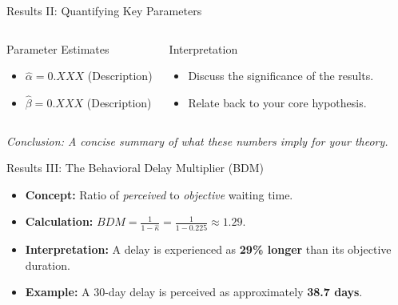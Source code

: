 \documentclass[10pt, aspectratio=169, xcolor={svgnames}]{beamer}
\begin{document}
\begin{frame}{Results II: Quantifying Key Parameters}
    \begin{columns}[T]
        \begin{block}{Parameter Estimates}
            \begin{itemize}
                \item $\hat{\alpha} = 0.XXX$ (Description)
                \item $\hat{\beta} = 0.XXX$ (Description)
            \end{itemize}
        \end{block}
        \begin{alertblock}{Interpretation}
            \begin{itemize}
                \item Discuss the significance of the results.
                \item Relate back to your core hypothesis.
            \end{itemize}
        \end{alertblock}
    \end{columns}
    \centering
    \vspace{0.5cm}
    \textit{Conclusion: A concise summary of what these numbers imply for your theory.}
\end{frame}

\begin{frame}{Results III: The Behavioral Delay Multiplier (BDM)}
    \begin{itemize}
        \item \textbf{Concept:} Ratio of \textit{perceived} to \textit{objective} waiting time.
        \item \textbf{Calculation:} $BDM = \frac{1}{1 - \hat{\kappa}} = \frac{1}{1 - 0.225} \approx \mathbf{1.29}$.
        \item \textbf{Interpretation:} A delay is experienced as \textbf{29\% longer} than its objective duration.
        \item \textbf{Example:} A 30-day delay is perceived as approximately \textbf{38.7 days}.
    \end{itemize}
    \begin{center}
    \end{center}
\end{frame}
\end{document}
